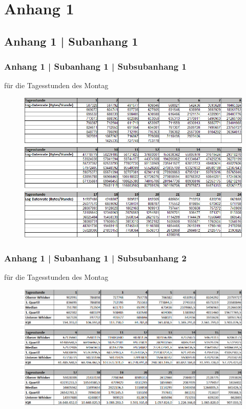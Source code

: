 \documentclass[deutsch]{lib/llncs/llncs}
\begin{document}
\newpage
\appendix


\section{Anhang 1}


\subsection{Anhang 1 | Subanhang 1}


\subsubsection{Anhang 1 | Subanhang 1 | Subsubanhang 1} für die Tagesstunden des Montag
\begin{figure}[!htb]
	\centering
	\includegraphics[scale=0.65]{img/BoxplotMessdatenPic1.png}
\end{figure}
\newpage


\subsubsection{Anhang 1 | Subanhang 1 | Subsubanhang 2} für die Tagesstunden des Montag
\begin{figure}[!htb]
	\centering
	\includegraphics[scale=0.65]{img/BoxplotDatenPic1.png}
\end{figure}
\end{document}
